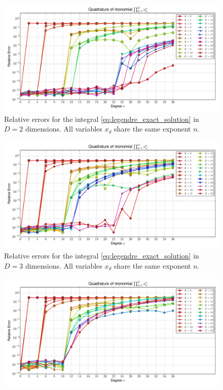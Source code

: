 \documentclass[a4paper,10pt]{article}
\begin{document}
\begin{subfigures}
  \begin{figure}\centering
    \includegraphics[width=\linewidth]{./img/monomial_errors_legendre_multivariate_dimension_2.pdf}
    \caption{Relative errors for the integral \eqref{eq:legendre_exact_solution}
    in $D=2$ dimensions. All variables $x_d$ share the same exponent $n$.}
    \label{fig:monomial_errors_legendre_multivariate_dimension_2}
  \end{figure}
  \begin{figure}\centering
    \includegraphics[width=\linewidth]{./img/monomial_errors_legendre_multivariate_dimension_3.pdf}
    \caption{Relative errors for the integral \eqref{eq:legendre_exact_solution}
    in $D=3$ dimensions. All variables $x_d$ share the same exponent $n$.}
    \label{fig:monomial_errors_legendre_multivariate_dimension_3}
  \end{figure}
  \begin{figure}\centering
    \includegraphics[width=\linewidth]{./img/monomial_errors_legendre_multivariate_dimension_4.pdf}

\end{figure}
\end{subfigures}
\end{document}
